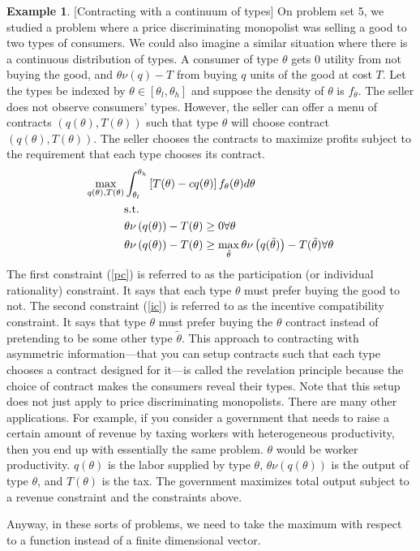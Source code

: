 \documentclass[12pt,reqno]{amsart}
\theoremstyle{definition}
\newtheorem{example}{Example}[section]
\begin{document}
\begin{example}\label{ex:contract}[Contracting with a continuum of
  types]
  On problem set 5, we studied a problem where a price discriminating
  monopolist was selling a good to two types of consumers. We could
  also imagine a similar situation where there is a continuous
  distribution of types. A consumer of type $\theta$ gets $0$ utility
  from not buying the good, and $\theta \nu(q) - T$ from buying $q$
  units of the good at cost $T$. Let the types be indexed by $\theta \in
  [\theta_l,\theta_h]$ and suppose the density of $\theta$ is $f_\theta$. The
  seller does not observe consumers' types. However, the seller can
  offer a menu of contracts $(q(\theta),T(\theta))$ such that type
  $\theta$ will choose contract $(q(\theta),T(\theta))$. The seller
  chooses the contracts to maximize profits subject to the requirement
  that each type chooses its contract.
  \begin{align}
    \max_{q(\theta),T(\theta)} & \int_{\theta_l}^{\theta_h} 
    \left[T(\theta) - cq(\theta)\right]
    f_\theta(\theta) d\theta \notag \\
    & \text{s.t.} \notag \\
    &\theta \nu\left(q(\theta)\right) - T(\theta) \geq 0  \forall
    \theta \label{pc} \\
    &\theta \nu\left(q(\theta)\right) - T(\theta) \geq
    \max_{\tilde{\theta}} \theta \nu\left(q(\tilde{\theta}) \right) -
    T(\tilde{\theta}) \forall \theta \label{ic} 
  \end{align}
  The first constraint (\ref{pc}) is referred to as the participation
  (or individual rationality)
  constraint. It says that each type $\theta$ must prefer buying the
  good to not. The second constraint  (\ref{ic}) is referred to as the
  incentive compatibility constraint. It says that type $\theta$ must
  prefer buying the $\theta$ contract instead of pretending to be
  some other type $\tilde{\theta}$. This approach to contracting with
  asymmetric information---that you can setup contracts such that each
  type chooses a contract designed for it---is called the revelation
  principle because the choice of contract makes the consumers reveal
  their types. Note that this setup does not just apply to price
  discriminating monopolists. There are many other applications. For
  example, if you consider a government that needs to raise a certain
  amount of revenue by taxing workers with heterogeneous productivity,
  then you end up with essentially the same problem. $\theta$ would be
  worker productivity. $q(\theta)$ is the labor supplied by type
  $\theta$, $\theta \nu(q(\theta))$ is the output of type $\theta$,
  and $T(\theta)$ is the tax. The government maximizes total output
  subject to a revenue constraint and the constraints above. 
  
  Anyway, in these sorts of problems, we need to take the maximum with
  respect to a function instead of a finite dimensional vector. 
\end{example}
\end{document}
